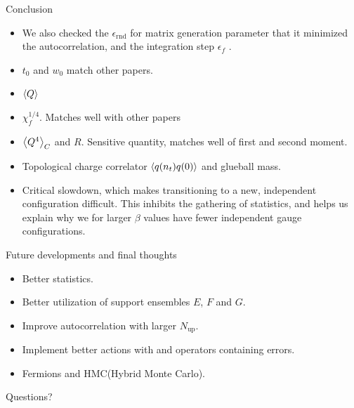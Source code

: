 \documentclass[10pt,show notes on second screen]{beamer}
\begin{document}
\begin{frame}{Conclusion}
{\begin{itemize}
    \item <4->We also checked the $\epsilon_\mathrm{rnd}$ for matrix generation parameter that it minimized the autocorrelation, and the integration step $\epsilon_f$ .
    \item <5->$t_0$ and $w_0$ match other papers.
    \item <6->$\left\langle{Q}\right\rangle$
    \item <7->$\chi^{1/4}_f$. Matches well with other papers
    \item <8->$\left\langle{Q^4}\right\rangle_C$ and $R$. Sensitive quantity, matches well of first and second moment.
    \item <9->Topological charge correlator $\left\langle{q(n_t)q(0)}\right\rangle$ and glueball mass.
    \item <10->Critical slowdown, which makes transitioning to a new, independent configuration difficult. This inhibits the gathering of statistics, and helps us explain why we for larger $\beta$ values have fewer independent gauge configurations.
\end{itemize}
}
\end{frame}

\begin{frame}{Future developments and final thoughts}
\begin{itemize}[<+->]
    \item Better statistics.
    \item Better utilization of support ensembles $E$, $F$ and $G$.
    \item Improve autocorrelation with larger $N_\mathrm{up}$.
    \item Implement better actions with and operators containing errors.
    \item Fermions and HMC(Hybrid Monte Carlo).
\end{itemize}
\end{frame}

\begin{frame}
\begin{center}
Questions?
\end{center}
\end{frame}

\end{document}
